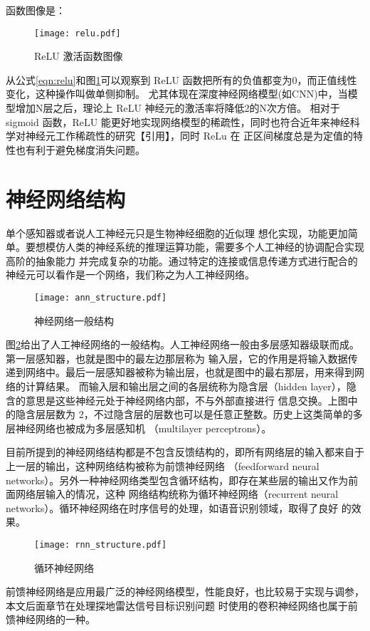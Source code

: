 函数图像是：
\begin{figure}[htbp]
	\texttt{[image: relu.pdf]}
	\caption{ReLU 激活函数图像}
	\label{relu}
\end{figure}

从公式\ref{eqn:relu}和图\ref{relu}可以观察到 ReLU 函数把所有的负值都变为0，而正值线性变化，这种操作叫做单侧抑制。
尤其体现在深度神经网络模型(如CNN)中，当模型增加N层之后，理论上 ReLU 神经元的激活率将降低2的N次方倍。
相对于 sigmoid 函数，ReLU 能更好地实现网络模型的稀疏性，同时也符合近年来神经科学对神经元工作稀疏性的研究【引用】，同时 ReLu 在
正区间梯度总是为定值的特性也有利于避免梯度消失问题。

\section{神经网络结构}
单个感知器或者说人工神经元只是生物神经细胞的近似理
想化实现，功能更加简单。要想模仿人类的神经系统的推理运算功能，需要多个人工神经的协调配合实现高阶的抽象能力
并完成复杂的功能。通过特定的连接或信息传递方式进行配合的神经元可以看作是一个网络，我们称之为人工神经网络。

\begin{figure}[htbp]
	\texttt{[image: ann\_structure.pdf]}
	\caption{神经网络一般结构}
	\label{ann_structure}
\end{figure}

图\ref{ann_structure}给出了人工神经网络的一般结构。人工神经网络一般由多层感知器级联而成。第一层感知器，也就是图中的最左边那层称为
输入层，它的作用是将输入数据传递到网络中。最后一层感知器被称为输出层，也就是图中的最右那层，用来得到网络的计算结果。
而输入层和输出层之间的各层统称为隐含层（hidden layer），隐含的意思是这些神经元处于神经网络内部，不与外部直接进行
信息交换。上图中的隐含层层数为 2，不过隐含层的层数也可以是任意正整数。历史上这类简单的多层神经网络也被成为多层感知机
（multilayer perceptrons）。

目前所提到的神经网络结构都是不包含反馈结构的，即所有网络层的输入都来自于上一层的输出，这种网络结构被称为前馈神经网络
（feedforward neural networks）。另外一种神经网络类型包含循环结构，即存在某些层的输出又作为前面网络层输入的情况，这种
网络结构统称为循环神经网络（recurrent neural networks）。循环神经网络在时序信号的处理，如语音识别领域，取得了良好
的效果。

\begin{figure}[htbp]
	\texttt{[image: rnn\_structure.pdf]}
	\caption{循环神经网络}
	\label{rnn_structure}
\end{figure}

前馈神经网络是应用最广泛的神经网络模型，性能良好，也比较易于实现与调参，本文后面章节在处理探地雷达信号目标识别问题
时使用的卷积神经网络也属于前馈神经网络的一种。

